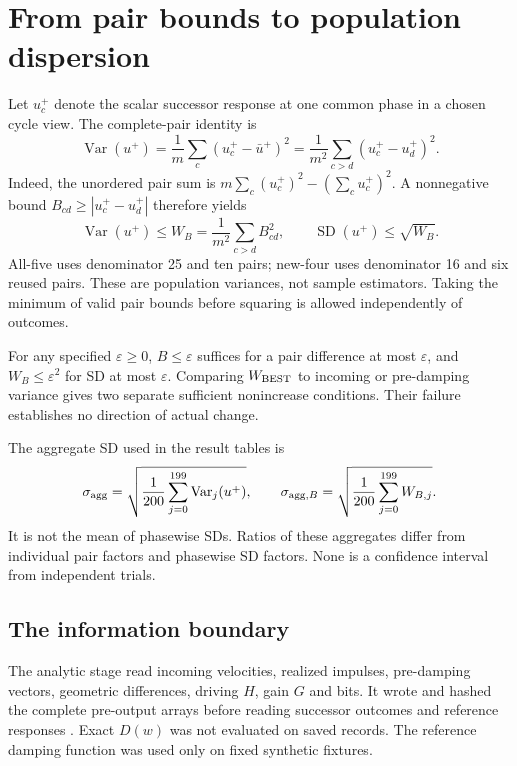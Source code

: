 \documentclass[11pt,a4paper]{article}
\begin{document}
\section{From pair bounds to population dispersion}\label{sec:variance}
Let $u_c^+$ denote the scalar successor response at one common phase in a chosen cycle view. The complete-pair identity is
\begin{equation}\label{eq:variance}
\operatorname{Var}(u^+)=\frac1m\sum_c(u_c^+-\bar u^+)^2
=\frac1{m^2}\sum_{c>d}(u_c^+-u_d^+)^2.
\end{equation}
Indeed, the unordered pair sum is $m\sum_c(u_c^+)^2-(\sum_cu_c^+)^2$. A nonnegative bound $B_{cd}\ge|u_c^+-u_d^+|$ therefore yields
\begin{equation}\label{eq:variancebound}
\operatorname{Var}(u^+)\le W_B=\frac1{m^2}\sum_{c>d}B_{cd}^2,
\qquad \operatorname{SD}(u^+)\le\sqrt{W_B}.
\end{equation}
All-five uses denominator 25 and ten pairs; new-four uses denominator 16 and six reused pairs. These are population variances, not sample estimators. Taking the minimum of valid pair bounds before squaring is allowed independently of outcomes.

For any specified $\varepsilon\ge0$, $B\le\varepsilon$ suffices for a pair difference at most $\varepsilon$, and $W_B\le\varepsilon^2$ for SD at most $\varepsilon$. Comparing $W_{\rm BEST}$ to incoming or pre-damping variance gives two separate sufficient nonincrease conditions. Their failure establishes no direction of actual change.

The aggregate SD used in the result tables is
\begin{equation}\label{eq:aggregate}
\sigma_{\rm agg}=\sqrt{\frac1{200}\sum_{j=0}^{199}\operatorname{Var}_j(u^+)},\qquad
\sigma_{{\rm agg},B}=\sqrt{\frac1{200}\sum_{j=0}^{199}W_{B,j}}.
\end{equation}
It is not the mean of phasewise SDs. Ratios of these aggregates differ from individual pair factors and phasewise SD factors. None is a confidence interval from independent trials.

\subsection{The information boundary}
The analytic stage read incoming velocities, realized impulses, pre-damping vectors, geometric differences, driving $H$, gain $G$ and bits. It wrote and hashed the complete pre-output arrays before reading successor outcomes and reference responses \cite{seal}. Exact $D(w)$ was not evaluated on saved records. The reference damping function was used only on fixed synthetic fixtures.
\end{document}
